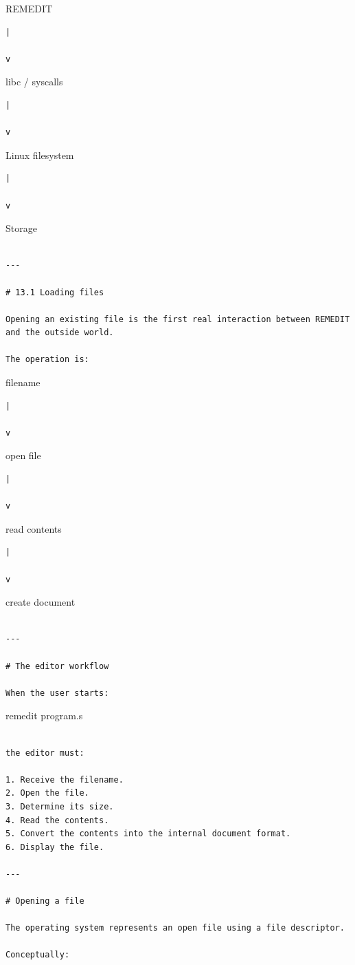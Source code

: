 \documentclass[
  oneside,
  openany]{book}
\begin{document}
REMEDIT

\begin{verbatim}
|

v
\end{verbatim}

libc / syscalls

\begin{verbatim}
|

v
\end{verbatim}

Linux filesystem

\begin{verbatim}
|

v
\end{verbatim}

Storage

\begin{verbatim}

---

# 13.1 Loading files

Opening an existing file is the first real interaction between REMEDIT and the outside world.

The operation is:
\end{verbatim}

filename

\begin{verbatim}
|

v
\end{verbatim}

open file

\begin{verbatim}
|

v
\end{verbatim}

read contents

\begin{verbatim}
|

v
\end{verbatim}

create document

\begin{verbatim}

---

# The editor workflow

When the user starts:
\end{verbatim}

remedit program.s

\begin{verbatim}

the editor must:

1. Receive the filename.
2. Open the file.
3. Determine its size.
4. Read the contents.
5. Convert the contents into the internal document format.
6. Display the file.

---

# Opening a file

The operating system represents an open file using a file descriptor.

Conceptually:
\end{verbatim}
\end{document}
